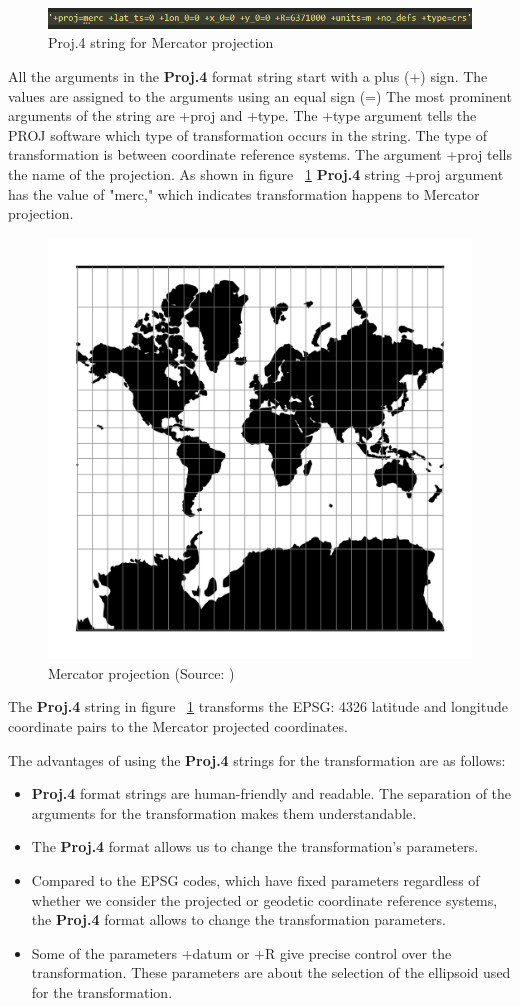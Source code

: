 \begin{figure}[h]
    \centering
    \includegraphics[width=1.0\linewidth]{figures/chapter-7/proj_string_mercator.png}
    \caption{Proj.4 string for Mercator projection}
    \label{fig:proj-string-mercator}
\end{figure}

All the arguments in the \textbf{Proj.4} format string start with a plus (+) sign. The values are assigned to the arguments using an equal sign (=) The most prominent arguments of the string are +proj and +type. The +type argument tells the PROJ software which type of transformation occurs in the string.
The type of transformation is between coordinate reference systems. The argument +proj tells the name of the projection. As shown in figure ~\ref{fig:proj-string-mercator} \textbf{Proj.4}  string +proj argument has the value of "merc," which indicates transformation happens to  Mercator projection.
\begin{figure}[h]
    \centering
    \includegraphics[width=0.5\linewidth]{figures/chapter-7/merc.png}
    \caption{Mercator projection (Source: \cite{PROJ_SITE})}
    \label{fig:mercator-projection}
\end{figure}

The \textbf{Proj.4} string in figure ~\ref{fig:proj-string-mercator} transforms the EPSG: 4326 latitude and longitude coordinate pairs to the Mercator projected coordinates.

The advantages of using the \textbf{Proj.4} strings for the transformation are as follows:
\begin{itemize}
    \item \textbf{Proj.4} format strings are human-friendly and readable. The separation of the arguments for the transformation makes them understandable.
    \item The \textbf{Proj.4} format allows us to change the transformation's parameters.
    \item Compared to the EPSG codes, which have fixed parameters regardless of whether we consider the projected or geodetic coordinate reference systems, the \textbf{Proj.4} format allows to change the transformation parameters.
    \item Some of the parameters +datum or +R give precise control over the transformation. These parameters are about the selection of the ellipsoid used for the transformation.
\end{itemize}


